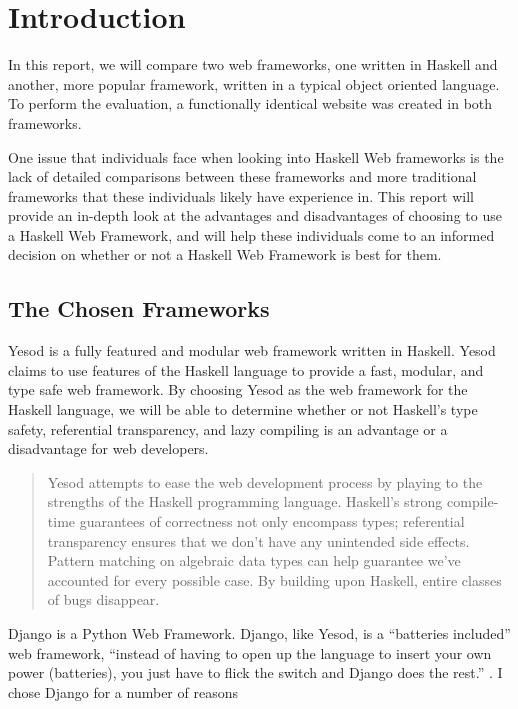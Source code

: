 \chapter{Introduction}
\label{chap:Introduction}

In this report, we will compare two web frameworks, one written in Haskell and another, more
popular framework, written in a typical object oriented language. To perform the evaluation,
a functionally identical website was created in both frameworks.

One issue that individuals face when looking into Haskell Web frameworks is the lack of
detailed comparisons between these frameworks and more traditional frameworks that these
individuals likely have experience in. This report will provide an in-depth look at the
advantages and disadvantages of choosing to use a Haskell Web Framework, and will help
these individuals come to an informed decision on whether or not a Haskell Web Framework is
best for them.

\section{The Chosen Frameworks}

Yesod is a fully featured and modular web framework written in Haskell. Yesod claims to use
features of the Haskell language to provide a fast, modular, and type safe web framework. By
choosing Yesod as the web framework for the Haskell language, we will be able to determine
whether or not Haskell's type safety, referential transparency, and lazy compiling is an advantage
or a disadvantage for web developers.

\begin{quote}
Yesod attempts to ease the web development process by playing to the strengths of the Haskell 
programming language. Haskell’s strong compile-time guarantees of correctness not only encompass 
types; referential transparency ensures that we don’t have any unintended side effects. Pattern 
matching on algebraic data types can help guarantee we’ve accounted for every possible case. 
By building upon Haskell, entire classes of bugs disappear. \parencite[Introduction]{yesodBook}
\end{quote}

Django is a Python Web Framework. Django, like Yesod, is a ``batteries included'' web framework,
``instead of having to open up the language to insert your own power (batteries), you just have
to flick the switch and Django does the rest.'' \parencite{djangoBookReasons}. I chose Django
for a number of reasons

